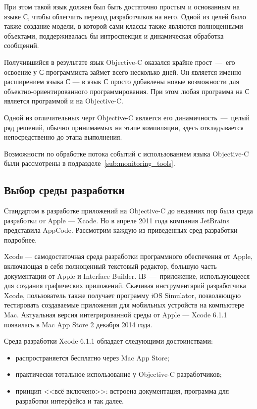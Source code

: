 При этом такой язык должен был быть достаточно простым и основанным на языке С,
чтобы облегчить переход разработчиков на него. Одной из целей было также
создание модели, в которой сами классы также являются полноценными объектами,
поддерживалась бы интроспекция и динамическая обработка сообщений.

Получившийся в результате язык Objective-C оказался крайне прост~---~его освоение
у С-программиста займет всего несколько дней. Он является именно расширением
языка С --- в язык С просто добавлены новые возможности для
объектно-ориентированного программирования. При этом любая программа на С
является программой и на Objective-C.

Одной из отличительных черт Objective-C является его динамичность~---~целый ряд
решений, обычно принимаемых на этапе компиляции, здесь откладывается
непосредственно до этапа выполнения.

Возможности по обработке потока событий с использованием языка Objective-C
были рассмотрены в подразделе~\ref{sub:monitoring_tools}.


\subsection{Выбор среды разработки}

Стандартом в разработке приложений на Objective-C до недавних пор была
среда разработки от Apple --- Xcode. Но в апреле 2011 года компания JetBrains
представила AppCode. Рассмотрим каждую из приведенных сред разработки подробнее.

Xcode --- самодостаточная среда разработки программного обеспечения от Apple,
включающая в себя полноценный текстовый редактор, большую часть документации
от Apple и Interface Builder. IB~---~приложение, использующееся для создания
графических приложений. Скачивая инструментарий разработчика Xcode,
пользователь также получает программу iOS Simulator, позволяющую тестировать
создаваемые приложения для мобильных устройств на компьютере Mac.
Актуальная версия интегрированной среды от Apple --- Xcode 6.1.1
появилась в Mac App Store 2 декабря 2014 года.

Среда разработки Xcode 6.1.1 обладает следующими достоинствами:
\begin{itemize}
  \item распространяется бесплатно через Mac App Store;
  \item практически тотальное использование у Objective-C разработчиков;
  \item принцип <<всё включено>>: встроена документация, программа для
    разработки интерфейса и так далее.
\end{itemize}

